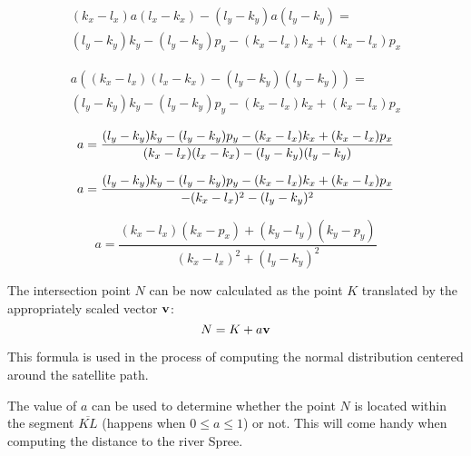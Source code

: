\documentclass[a4paper,12pt]{article}
\begin{document}
\begin{equation*}
\begin{multlined}
(k_x - l_x) a (l_x - k_x) - (l_y - k_y) a (l_y - k_y) =\\
(l_y - k_y) k_y - (l_y - k_y) p_y - (k_x - l_x) k_x + (k_x - l_x) p_x
\end{multlined}
\end{equation*}

\begin{equation*}
\begin{multlined}
a ((k_x - l_x) (l_x - k_x) - (l_y - k_y) (l_y - k_y)) =\\
(l_y - k_y) k_y - (l_y - k_y) p_y - (k_x - l_x) k_x + (k_x - l_x) p_x
\end{multlined}
\end{equation*}

\begin{equation*}
  a = \frac{(l_y - k_y)k_y - (l_y - k_y)p_y - (k_x - l_x)k_x + (k_x - l_x)p_x}{(k_x - l_x)(l_x - k_x) - (l_y - k_y)(l_y - k_y)}\\
\end{equation*}

\begin{equation*}
  a = \frac{(l_y - k_y)k_y - (l_y - k_y)p_y - (k_x - l_x)k_x + (k_x - l_x)p_x}{- (k_x - l_x)^2 - (l_y - k_y)^2}\\
\end{equation*}

\begin{equation*}
  a = \frac{(k_x - l_x)(k_x - p_x) + (k_y - l_y)(k_y - p_y)}{(k_x - l_x)^2 + (l_y - k_y)^2}
\end{equation*}

The intersection point \(N\) can be now calculated as the point \(K\)
translated by the appropriately scaled vector \(\vb{v}\):
\[N = K + a\vb{v}\]

This formula is used in the process of computing the normal distribution centered around the satellite path.

The value of \(a\) can be used to determine whether the point \(N\) is located within
the segment \(\overline{KL}\) (happens when \(0 \leq a \leq 1\)) or not. This will come handy when computing
the distance to the river Spree.
\end{document}
